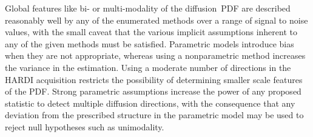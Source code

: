 \documentclass[dvips,aoas,preprint]{imsart}
\numberwithin{equation}{section}
\theoremstyle{plain}
\begin{document}
%


Global features like bi- or multi-modality of the diffusion~PDF are
described reasonably well by any of the enumerated methods over a
range of signal to noise values, with the small caveat that the
various implicit assumptions inherent to any of the given methods must
be satisfied.  Parametric models introduce bias when they are not
appropriate, whereas using a nonparametric method increases the
variance in the estimation.  Using a moderate number of directions in
the HARDI acquisition restricts the possibility of determining smaller
scale features of the PDF.  Strong parametric assumptions increase the
power of any proposed statistic to detect multiple diffusion
directions, with the consequence that any deviation from the
prescribed structure in the parametric model may be used to reject
null hypotheses such as unimodality.  
\end{document}
